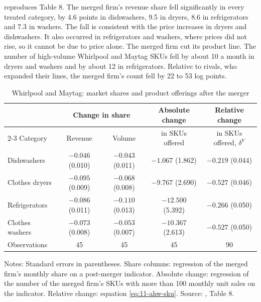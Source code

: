   reproduces Table 8. The merged firm's revenue share
fell significantly in every treated category, by 4.6 points in dishwashers, 9.5 in dryers, 8.6 in refrigerators
and 7.3 in washers. The fall is consistent with the price increases in dryers and dishwashers. It also occurred in
refrigerators and washers, where prices did not rise, so it cannot be due to price alone. The merged firm cut its
product line. The number of high-volume Whirlpool and Maytag SKUs fell by about 10 a month in dryers and washers
and by about 12 in refrigerators. Relative to rivals, who expanded their lines, the merged firm's count fell by 22
to 53 log points.

\begin{table}[htbp]
\centering
\caption{Whirlpool and Maytag: market shares and product offerings after the merger}
\label{tab:11-maytag-var}
\footnotesize
\begin{tabular}{@{}lcccc@{}}
\toprule
& \multicolumn{2}{c}{Change in share} & Absolute change & Relative change \\
\cmidrule(lr){2-3}
Category & Revenue & Volume & in SKUs offered & in SKUs offered, $\delta^V$ \\
\midrule
Dishwashers & $-0.046$ (0.010) & $-0.043$ (0.011) & $-1.067$ (1.862) & $-0.219$ (0.044) \\
Clothes dryers & $-0.095$ (0.009) & $-0.068$ (0.008) & $-9.767$ (2.690) & $-0.527$ (0.046) \\
Refrigerators & $-0.086$ (0.011) & $-0.110$ (0.013) & $-12.500$ (5.392) & $-0.266$ (0.050) \\
Clothes washers & $-0.073$ (0.008) & $-0.053$ (0.007) & $-10.367$ (2.613) & $-0.527$ (0.050) \\
Observations & 45 & 45 & 45 & 90 \\
\bottomrule
\end{tabular}

\smallskip
\begin{minipage}{0.92\linewidth}
\footnotesize Notes: Standard errors in parentheses. Share columns: regression of the merged firm's monthly share
on a post-merger indicator. Absolute change: regression of the number of the merged firm's SKUs with more than 100
monthly unit sales on the indicator. Relative change: equation \eqref{eq:11-ahw-sku}. Source:
\citet{AshenfelterHoskenWeinberg2011}, Table 8.
\end{minipage}
\end{table}

